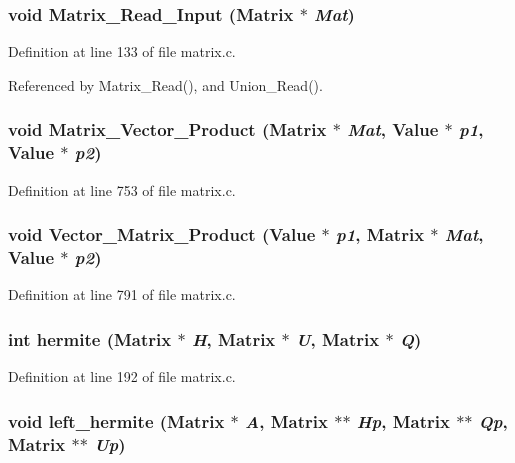 \subsubsection{\setlength{\rightskip}{0pt plus 5cm}void Matrix\_\-Read\_\-Input (Matrix $\ast$ {\em Mat})}\label{matrix_8c_a3}




Definition at line 133 of file matrix.c.

Referenced by Matrix\_\-Read(), and Union\_\-Read().

\subsubsection{\setlength{\rightskip}{0pt plus 5cm}void Matrix\_\-Vector\_\-Product (Matrix $\ast$ {\em Mat}, Value $\ast$ {\em p1}, Value $\ast$ {\em p2})}\label{matrix_8c_a10}




Definition at line 753 of file matrix.c.
\subsubsection{\setlength{\rightskip}{0pt plus 5cm}void Vector\_\-Matrix\_\-Product (Value $\ast$ {\em p1}, Matrix $\ast$ {\em Mat}, Value $\ast$ {\em p2})}\label{matrix_8c_a11}




Definition at line 791 of file matrix.c.
\subsubsection{\setlength{\rightskip}{0pt plus 5cm}int hermite (Matrix $\ast$ {\em H}, Matrix $\ast$ {\em U}, Matrix $\ast$ {\em Q})\hspace{0.3cm}{\tt  [static]}}\label{matrix_8c_a5}




Definition at line 192 of file matrix.c.
\subsubsection{\setlength{\rightskip}{0pt plus 5cm}void left\_\-hermite (Matrix $\ast$ {\em A}, Matrix $\ast$$\ast$ {\em Hp}, Matrix $\ast$$\ast$ {\em Qp}, Matrix $\ast$$\ast$ {\em Up})}\label{matrix_8c_a7}




